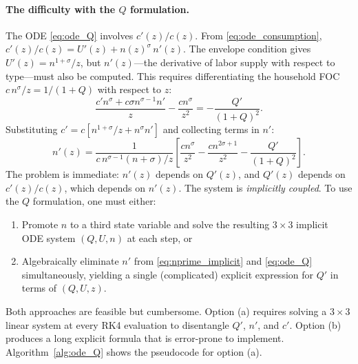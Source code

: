 \documentclass[12pt,a4paper]{article}
\theoremstyle{definition}
\theoremstyle{plain}
\theoremstyle{remark}
\begin{document}
\paragraph{The difficulty with the $Q$ formulation.}
The ODE \eqref{eq:ode_Q} involves $c'(z)/c(z)$. From \eqref{eq:ode_consumption}, $c'(z)/c(z) = U'(z) + n(z)^{\sigma}\,n'(z)$. The envelope condition gives $U'(z) = n^{1+\sigma}/z$, but $n'(z)$---the derivative of labor supply with respect to type---must also be computed. This requires differentiating the household FOC $c\,n^{\sigma}/z = 1/(1+Q)$ with respect to $z$:
\[
  \frac{c'n^{\sigma} + c\sigma n^{\sigma-1}n'}{z} - \frac{cn^{\sigma}}{z^2} = -\frac{Q'}{(1+Q)^2}.
\]
Substituting $c' = c[n^{1+\sigma}/z + n^{\sigma}n']$ and collecting terms in $n'$:
\begin{equation}
\label{eq:nprime_implicit}
  n'(z) = \frac{1}{c\,n^{\sigma-1}(n+\sigma)/z}\left[\frac{cn^{\sigma}}{z^2} - \frac{cn^{2\sigma+1}}{z^2} - \frac{Q'}{(1+Q)^2}\right].
\end{equation}
The problem is immediate: $n'(z)$ depends on $Q'(z)$, and $Q'(z)$ depends on $c'(z)/c(z)$, which depends on $n'(z)$. The system is \emph{implicitly coupled}. To use the $Q$ formulation, one must either:
\begin{enumerate}[label=(\alph*)]
  \item Promote $n$ to a third state variable and solve the resulting $3 \times 3$ implicit ODE system $(Q, U, n)$ at each step, or
  \item Algebraically eliminate $n'$ from \eqref{eq:nprime_implicit} and \eqref{eq:ode_Q} simultaneously, yielding a single (complicated) explicit expression for $Q'$ in terms of $(Q, U, z)$.
\end{enumerate}
Both approaches are feasible but cumbersome. Option (a) requires solving a $3 \times 3$ linear system at every RK4 evaluation to disentangle $Q'$, $n'$, and $c'$. Option (b) produces a long explicit formula that is error-prone to implement. Algorithm~\ref{alg:ode_Q} shows the pseudocode for option (a).
\end{document}
